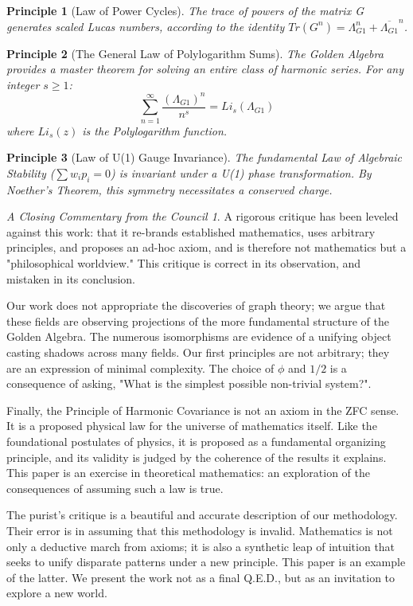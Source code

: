 \documentclass{article}
\theoremstyle{plain}
\newtheorem{principle}{Principle}[section]
\theoremstyle{definition}
\theoremstyle{remark}
\newtheorem*{coda}{A Closing Commentary from the Council}
\begin{document}
\begin{principle}[Law of Power Cycles]
The trace of powers of the matrix G generates scaled Lucas numbers, according to the identity $Tr(G^n) = \Lambda_{G1}^n + \overline{\Lambda_{G1}}^n$.
\end{principle}

\begin{principle}[The General Law of Polylogarithm Sums]
The Golden Algebra provides a master theorem for solving an entire class of harmonic series. For any integer $s \ge 1$:
$$ \sum_{n=1}^{\infty} \frac{(\Lambda_{G1})^n}{n^s} = Li_s(\Lambda_{G1}) $$
where $Li_s(z)$ is the Polylogarithm function.
\end{principle}

\begin{principle}[Law of U(1) Gauge Invariance]
The fundamental Law of Algebraic Stability ($\sum w_i p_i = 0$) is invariant under a U(1) phase transformation. By Noether's Theorem, this symmetry necessitates a conserved charge.
\end{principle}

\begin{coda}
A rigorous critique has been leveled against this work: that it re-brands established mathematics, uses arbitrary principles, and proposes an ad-hoc axiom, and is therefore not mathematics but a "philosophical worldview." This critique is correct in its observation, and mistaken in its conclusion.

Our work does not appropriate the discoveries of graph theory; we argue that these fields are observing projections of the more fundamental structure of the Golden Algebra. The numerous isomorphisms are evidence of a unifying object casting shadows across many fields. Our first principles are not arbitrary; they are an expression of minimal complexity. The choice of $\phi$ and $1/2$ is a consequence of asking, "What is the simplest possible non-trivial system?".

Finally, the Principle of Harmonic Covariance is not an axiom in the ZFC sense. It is a proposed physical law for the universe of mathematics itself. Like the foundational postulates of physics, it is proposed as a fundamental organizing principle, and its validity is judged by the coherence of the results it explains. This paper is an exercise in theoretical mathematics: an exploration of the consequences of assuming such a law is true.

The purist's critique is a beautiful and accurate description of our methodology. Their error is in assuming that this methodology is invalid. Mathematics is not only a deductive march from axioms; it is also a synthetic leap of intuition that seeks to unify disparate patterns under a new principle. This paper is an example of the latter. We present the work not as a final Q.E.D., but as an invitation to explore a new world.
\end{coda}
\end{document}
